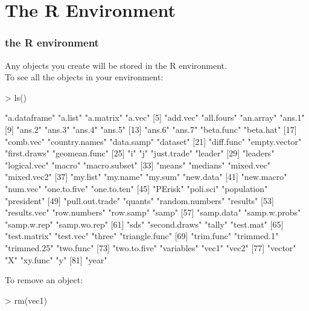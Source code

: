 \documentclass[handout]{beamer}
\newcommand{\red}{\color{red}}
\newcommand{\black}{\color{black}}
\begin{document}
\section{The R Environment}
\begin{frame}[fragile]
\frametitle{the R environment}
Any objects you create will be stored in the R environment. \\
\pause
\bigskip
To see all the objects in your environment:
\pause
\red
\footnotesize
\begin{Schunk}
\begin{Sinput}
> ls()
\end{Sinput}
\begin{Soutput}
 [1] "a.dataframe"    "a.list"         "a.matrix"       "a.vec"         
 [5] "add.vec"        "all.fours"      "an.array"       "ans.1"         
 [9] "ans.2"          "ans.3"          "ans.4"          "ans.5"         
[13] "ans.6"          "ans.7"          "beta.func"      "beta.hat"      
[17] "comb.vec"       "country.names"  "data.samp"      "dataset"       
[21] "diff.func"      "empty.vector"   "first.draws"    "geomean.func"  
[25] "i"              "j"              "just.trade"     "leader"        
[29] "leaders"        "logical.vec"    "macro"          "macro.subset"  
[33] "means"          "medians"        "mixed.vec"      "mixed.vec2"    
[37] "my.list"        "my.name"        "my.sum"         "new.data"      
[41] "new.macro"      "num.vec"        "one.to.five"    "one.to.ten"    
[45] "PErisk"         "poli.sci"       "population"     "president"     
[49] "pull.out.trade" "quants"         "random.numbers" "results"       
[53] "results.vec"    "row.numbers"    "row.samp"       "samp"          
[57] "samp.data"      "samp.w.probs"   "samp.w.rep"     "samp.wo.rep"   
[61] "sds"            "second.draws"   "tally"          "test.mat"      
[65] "test.matrix"    "test.vec"       "three"          "triangle.func" 
[69] "trim.func"      "trimmed.1"      "trimmed.25"     "two.func"      
[73] "two.to.five"    "variables"      "vec1"           "vec2"          
[77] "vector"         "X"              "xy.func"        "y"             
[81] "year"          
\end{Soutput}
\end{Schunk}
\normalsize
\black
\pause
\bigskip
To remove an object:
\pause
\red
\footnotesize
\begin{Schunk}
\begin{Sinput}
> rm(vec1)
\end{Sinput}
\end{Schunk}
\end{frame}
\end{document}
